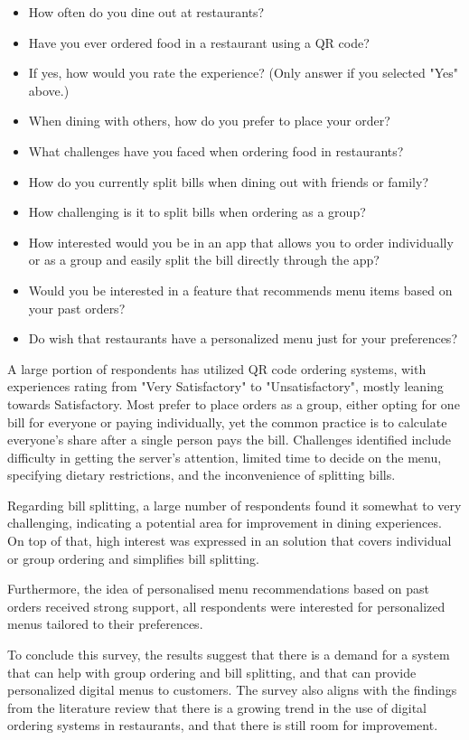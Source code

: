 \begin{itemize}
    \item How often do you dine out at restaurants?
    \item Have you ever ordered food in a restaurant using a QR code?
    \item If yes, how would you rate the experience? (Only answer if you selected "Yes" above.)
    \item When dining with others, how do you prefer to place your order?
    \item What challenges have you faced when ordering food in restaurants?
    \item How do you currently split bills when dining out with friends or family?
    \item How challenging is it to split bills when ordering as a group?
    \item How interested would you be in an app that allows you to order individually or as a group and easily split the bill directly through the app?
    \item Would you be interested in a feature that recommends menu items based on your past orders?
    \item Do wish that restaurants have a personalized menu just for your preferences?
\end{itemize}

A large portion of respondents has utilized QR code ordering systems, with experiences rating from "Very Satisfactory" to "Unsatisfactory", mostly leaning towards Satisfactory. Most prefer to place orders as a group, either opting for one bill for everyone or paying individually, yet the common practice is to calculate everyone's share after a single person pays the bill. Challenges identified include difficulty in getting the server's attention, limited time to decide on the menu, specifying dietary restrictions, and the inconvenience of splitting bills.

Regarding bill splitting, a large number of respondents found it somewhat to very challenging, indicating a potential area for improvement in dining experiences. On top of that, high interest was expressed in an solution that covers individual or group ordering and simplifies bill splitting.

Furthermore, the idea of personalised menu recommendations based on past orders received strong support, all respondents were interested for personalized menus tailored to their preferences.

To conclude this survey, the results suggest that there is a demand for a system that can help with group ordering and bill splitting, and that can provide personalized digital menus to customers. The survey also aligns with the findings from the literature review that there is a growing trend in the use of digital ordering systems in restaurants, and that there is still room for improvement.

